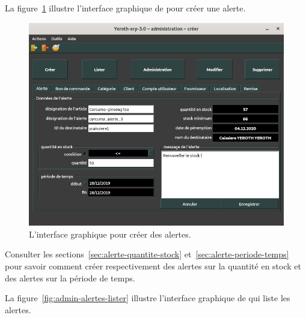 
\newpage
{}\label{sec:administration-alertes-creer}

La figure~\ref{fig:admin-alertes-creer} illustre l'interface
graphique de \yeren pour cr\'eer une alerte.\\

\begin{figure}[!htpb]
	\centering
	\includegraphics[scale=0.45]{images/alerte-creer.png}
	\caption{L'interface graphique pour cr\'eer des alertes.}
	\label{fig:admin-alertes-creer}
\end{figure}

Consulter les sections~\ref{sec:alerte-quantite-stock}
et~\ref{sec:alerte-periode-temps} pour savoir comment
cr\'eer respectivement des alertes sur la quantit\'e en
stock et des alertes sur la p\'eriode de temps.


\newpage
{}\label{sec:administration-alertes-lister}

La figure~\ref{fig:admin-alertes-lister} illustre l'interface
graphique de \yeren qui liste les alertes.\\


